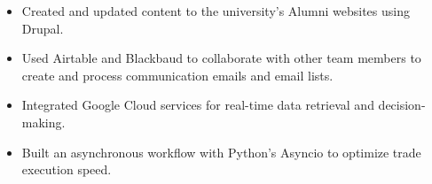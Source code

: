 \documentclass[10pt,a4paper,ragged2e,withhyper]{altacv}
\begin{document}
\begin{paracol}{2}
    \divider


\begin{itemize}
\item Created and updated content to the university's Alumni websites using Drupal.
\item Used Airtable and Blackbaud to collaborate with other team members to create and process communication emails and email lists.
    \end{itemize}

\smallskip \smallskip
    \newline
       			 





    \switchcolumn

                  


    \smallskip

     
    \newline
      

    \smallskip

          \newline {}  

    \bigskip
    \smallskip



     \newline
      


    \switchcolumn


    \begin{itemize}
    \item Integrated Google Cloud services for real-time data retrieval and decision-making.
    \item Built an asynchronous workflow with Python’s Asyncio to optimize trade execution speed.
    \end{itemize}


\end{paracol}
\end{document}
